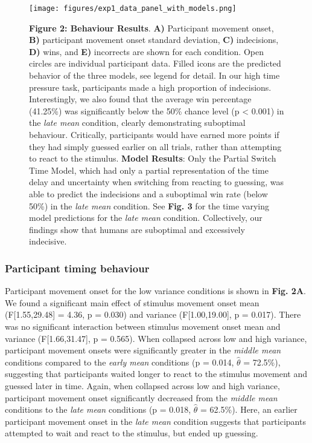 \documentclass[man,donotrepeattitle,floatsintext,letterpaper,12pt]{apa7}
\newcommand\boldblue[1]{\textcolor{mydarkblue}{\textbf{#1}}}
\begin{document}
\begin{figure}[H]
  \begin{minipage}[c][\pdfpageheight][t]{0.5\textwidth}

      \texttt{[image: figures/exp1\_data\_panel\_with\_models.png]}
  \end{minipage}\hfill
  \begin{minipage}[c][\pdfpageheight][t]{0.5\textwidth}
      \caption*{
        \boldblue{Figure 2: Behaviour Results}. \boldblue{A)} Participant movement onset, \boldblue{B)} participant movement onset standard deviation, \boldblue{C)} indecisions, \boldblue{D)} wins, and \boldblue{E)} incorrects are shown for each condition. Open circles are individual participant data. Filled icons are the predicted behavior of the three models, see legend for detail. In our high time pressure task, participants made a high proportion of indecisions. Interestingly, we also found that the average win percentage (41.25\%) was significantly below the 50\% chance level (p < 0.001) in the \emph{late mean} condition, clearly demonstrating suboptimal behaviour. Critically, participants would have earned more points if they had simply guessed earlier on all trials, rather than attempting to react to the stimulus. \boldblue{Model Results}: Only the Partial Switch Time Model, which had only a partial representation of the time delay and uncertainty when switching from reacting to guessing, was able to predict the indecisions and a suboptimal win rate (below 50\%) in the \emph{late mean} condition. See \boldblue{Fig. 3} for the time varying model predictions for the \emph{late mean} condition. Collectively, our findings show that humans are suboptimal and excessively indecisive.} 
  \end{minipage}
\end{figure}

\subsubsection{Participant timing behaviour}

\noindent Participant movement onset for the low variance conditions is shown in \boldblue{Fig. 2A}. We found a significant main effect of stimulus movement onset mean (F[1.55,29.48] = 4.36, p = 0.030) and variance (F[1.00,19.00], p = 0.017). There was no significant interaction between stimulus movement onset mean and variance (F[1.66,31.47], p = 0.565). 
When collapsed across low and high variance, participant movement onsets were significantly greater in the \emph{middle mean} conditions compared to the \emph{early mean} conditions (p = 0.014, $\hat{\theta}$ = 72.5\%), suggesting that participants waited longer to react to the stimulus movement and guessed later in time. Again, when collapsed across low and high variance, participant movement onset significantly decreased from the \emph{middle mean} conditions to the \emph{late mean} conditions (p = 0.018, $\hat{\theta}$ = 62.5\%). Here, an earlier participant movement onset in the \emph{late mean} condition suggests that participants attempted to wait and react to the stimulus, but ended up guessing.
\end{document}
